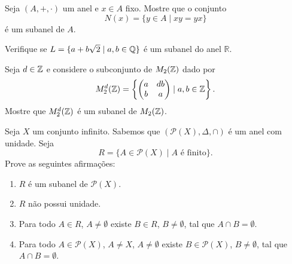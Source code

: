 \documentclass[12pt]{exam}
\begin{document}
\vspace{.3cm}

\questao{} Seja $(A, + , \cdot)$ um anel e $x \in A$ fixo. Mostre que o conjunto
\[
    N(x) = \{y \in A \mid xy = yx\}
\]
é um subanel de $A$.

\newpage

\questao{} Verifique se $L = \{ a + b\sqrt{2} \mid a, b \in \mathbb{Q}\}$ é um subanel
do anel $\mathbb{R}$.

\vspace{.3cm}

\questao{} Seja $d \in \mathbb{Z}$ e considere o subconjunto de $M_2(\mathbb{Z})$ dado por
\[
    M_2^d(\mathbb{Z}) = \left\{\begin{pmatrix} a & db \\ b & a \end{pmatrix} \mid a, b \in \mathbb{Z}\right\}.
\]
Mostre que $M_2^d(\mathbb{Z})$ é um subanel de $M_2(\mathbb{Z})$.

\vspace{.3cm}

\questao{} Seja $X$ um conjunto infinito. Sabemos que $(\mathcal{P}(X), \Delta, \cap)$ é um anel com unidade. Seja
\[
    R = \{A \in \mathcal{P}(X) \mid A \mbox{ é finito}\}.
\]
Prove as seguintes afirmações:
\begin{enumerate}[label=({\alph*})]
    \item $R$ é um subanel de $\mathcal{P}(X)$.

    \item $R$ não possui unidade.

    \item Para todo $A \in R$, $A \ne \emptyset$ existe $B \in R$, $B \ne \emptyset$, tal que $A \cap B = \emptyset$.

    \item Para todo $A \in \mathcal{P}(X)$, $A \ne X$, $A \ne \emptyset$ existe $B \in \mathcal{P}(X)$, $B \ne \emptyset$, tal que $A \cap B = \emptyset$.
\end{enumerate}

\vspace{.6cm}
\end{document}

